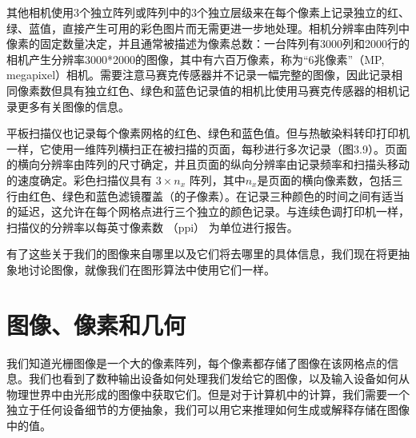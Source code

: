 \documentclass[lang=cn,12pt,marginpar=margintrue]{elegantbook}
\begin{document}

其他相机使用3个独立阵列或阵列中的3个独立层级来在每个像素上记录独立的红、绿、蓝值，直接产生可用的彩色图片而无需更进一步地处理。相机分辨率由阵列中像素的固定数量决定，并且通常被描述为像素总数：一台阵列有3000列和2000行的相机产生分辨率3000*2000的图像，其中有六百万像素，称为“6兆像素”（MP, megapixel）相机。需要注意马赛克传感器并不记录一幅完整的图像，因此记录相同像素数但具有独立红色、绿色和蓝色记录值的相机比使用马赛克传感器的相机记录更多有关图像的信息。


平板扫描仪也记录每个像素网格的红色、绿色和蓝色值。但与热敏染料转印打印机一样，它使用一维阵列横扫正在被扫描的页面，每秒进行多次记录（图3.9）。页面的横向分辨率由阵列的尺寸确定，并且页面的纵向分辨率由记录频率和扫描头移动的速度确定。彩色扫描仪具有 $3\times n_x$ 阵列，其中$n_x$是页面的横向像素数，包括三行由红色、绿色和蓝色滤镜覆盖（的子像素）。在记录三种颜色的时间之间有适当的延迟，这允许在每个网格点进行三个独立的颜色记录。与连续色调打印机一样，扫描仪的分辨率以每英寸像素数 （ppi） 为单位进行报告。

有了这些关于我们的图像来自哪里以及它们将去哪里的具体信息，我们现在将更抽象地讨论图像，就像我们在图形算法中使用它们一样。


\section{图像、像素和几何}

我们知道光栅图像是一个大的像素阵列，每个像素都存储了图像在该网格点的信息。我们也看到了数种输出设备如何处理我们发给它的图像，以及输入设备如何从物理世界中由光形成的图像中获取它们。但是对于计算机中的计算，我们需要一个独立于任何设备细节的方便抽象，我们可以用它来推理如何生成或解释存储在图像中的值。
\end{document}
